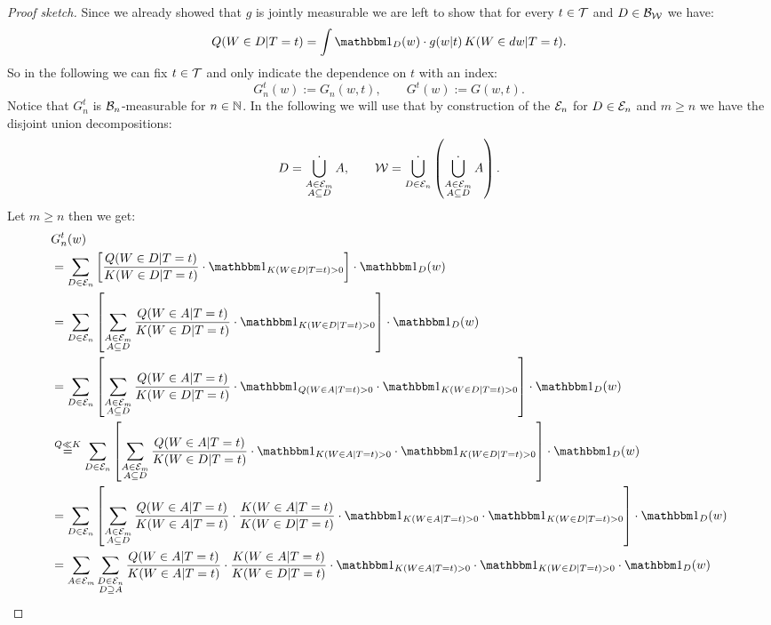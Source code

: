 \begin{Thm}
\begin{proof}[Proof sketch]
     Since we already showed that $g$ is jointly measurable we are left to show that for every $t \in \mathcal{T}$ and 
     $D \in \mathcal{B}_{\mathcal{W}}$ we have:
    \[ Q(W \in D|T=t) = \int \I_D(w) \cdot g(w|t) \, K(W \in dw|T=t). \]
     So in the following we can fix $t \in \mathcal{T}$ and only indicate the dependence on $t$ with an index:
     \[  G_n^t(w):=G_n(w,t), \qquad G^t(w):=G(w,t).  \]
     Notice that $G_n^t$ is $\mathcal{B}_n$-measurable for $n \in \mathbb{N}$.
     In the following we will use that by construction of the $\mathcal{E}_n$ for $D \in \mathcal{E}_n$ and $m \ge n$ we have the disjoint union decompositions:
     \[D = \mathop{\dot{\bigcup}}_{\substack{A \in \mathcal{E}_m\\ A \subseteq D}} A, \qquad \mathcal{W} = \mathop{\dot{\bigcup}}_{D \in \mathcal{E}_n} \left ( \mathop{\dot{\bigcup}}_{\substack{A \in \mathcal{E}_m\\ A \subseteq D}} A \right ).\]
 Let $m \ge n$ then we get:
     \begin{align*}
        & G_n^t(w)\\ 
         & = \sum_{D \in \Ecal_n}  \lB \frac{Q(W \in D|T=t)}{K(W \in D|T=t)}  \cdot 
     \I_{K(W \in D|T=t)>0} \rB  \cdot \I_D(w)  \\
             & = \sum_{D \in \Ecal_n}  \lB \sum_{\substack{A \in \Ecal_{m}\\ A \ins D}}\frac{Q(W \in A|T=t)}{K(W \in D|T=t)}  \cdot \I_{K(W \in D|T=t)>0} \rB  \cdot \I_D(w)  \\
             & = \sum_{D \in \Ecal_n}  \lB \sum_{\substack{A \in \Ecal_{m}\\ A \ins D}}\frac{Q(W \in A|T=t)}{K(W \in D|T=t)}  \cdot \I_{Q(W \in A|T=t)>0} \cdot \I_{K(W \in D|T=t)>0}\rB  \cdot \I_D(w)  \\
             & \stackrel{Q \ll K}{=} \sum_{D \in \Ecal_n}  \lB \sum_{\substack{A \in \Ecal_{m}\\ A \ins D}}\frac{Q(W \in A|T=t)}{K(W \in D|T=t)}  \cdot \I_{K(W \in A|T=t)>0} \cdot \I_{K(W \in D|T=t)>0}\rB  \cdot \I_D(w)  \\
             &= \sum_{D \in \Ecal_n}  \lB \sum_{\substack{A \in \Ecal_{m}\\ A \ins D}}\frac{Q(W \in A|T=t)}{K(W \in A|T=t)}  \cdot\frac{K(W \in A|T=t)}{K(W \in D|T=t)}\cdot \I_{K(W \in A|T=t)>0}\cdot \I_{K(W \in D|T=t)>0} \rB  \cdot \I_D(w)  \\
             &= \sum_{A \in \Ecal_m}   \sum_{\substack{D \in \Ecal_n\\ D \sni A}}\frac{Q(W \in A|T=t)}{K(W \in A|T=t)}  \cdot\frac{K(W \in A|T=t)}{K(W \in D|T=t)}\cdot \I_{K(W \in A|T=t)>0}\cdot \I_{K(W \in D|T=t)>0}   \cdot \I_D(w)  \\

\end{align*}
\end{proof}
\end{Thm}
